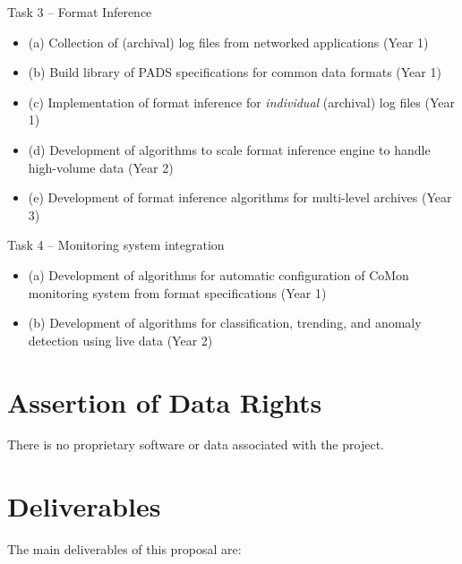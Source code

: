 \documentclass[12pt]{article}
\begin{document}
\noindent
Task 3 -- Format Inference
\begin{itemize}
\item (a) Collection of (archival) log files from networked applications (Year 1)
\item (b) Build library of PADS specifications for common data formats (Year 1)
\item (c) Implementation of format inference for {\em individual} (archival) log files (Year 1)
\item (d) Development of algorithms to scale format inference engine to handle high-volume data (Year 2)
\item (e) Development of format inference algorithms for multi-level archives (Year 3)
\end{itemize}

\noindent
Task 4 -- Monitoring system integration
\begin{itemize}
\item (a) Development of algorithms for automatic configuration of CoMon monitoring system from format specifications (Year 1)
\item (b) Development of algorithms for classification, trending, and 
anomaly detection using live data (Year 2)
\end{itemize}




\section{Assertion of Data Rights}

There is no proprietary software or data associated with the project.

\section{Deliverables}

The main deliverables of this proposal are:
\end{document}
